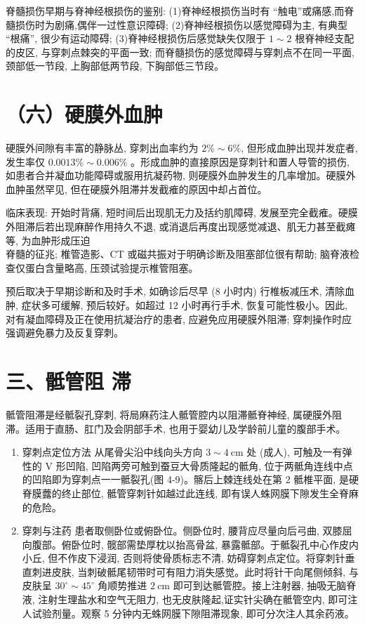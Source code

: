 \documentclass[10pt]{article}
\begin{document}
脊髓损伤早期与脊神经根损伤的鉴别: (1)脊神经根损伤当时有 “触电”或痛感,而脊髓损伤时为剧痛,偶伴一过性意识障碍; (2)脊神经根损伤以感觉障碍为主, 有典型 “根痛”, 很少有运动障碍; (3)脊神经根损伤后感觉缺失仅限于 $1 \sim 2$ 根脊神经支配的皮区, 与穿刺点棘突的平面一致; 而脊髓损伤的感觉障碍与穿刺点不在同一平面, 颈部低一节段, 上胸部低两节段, 下胸部低三节段。

\section*{（六）硬膜外血肿}
硬膜外间隙有丰富的静脉丛, 穿刺出血率约为 $2 \% \sim 6 \%$, 但形成血肿出现并发症者, 发生率仅 $0.0013 \% \sim 0.006 \%$ 。形成血肿的直接原因是穿刺针和置人导管的损伤, 如患者合并凝血功能障碍或服用抗凝药物, 则硬膜外血肿发生的几率增加。硬膜外血肿虽然罕见, 但在硬膜外阻滞并发截痽的原因中却占首位。

临床表现: 开始时背痛, 短时间后出现肌无力及括约肌障碍, 发展至完全截痽。硬膜外阻滞后若出现麻醉作用持久不退, 或消退后再度出现感觉减退、肌无力甚至截瘫等, 为血肿形成压迫\\
脊髓的征兆; 椎管造影、CT 或磁共振对于明确诊断及阻塞部位很有帮助; 脑脊液检查仅蛋白含量略高, 压颈试验提示椎管阻塞。

预后取决于早期诊断和及时手术, 如确诊后尽早 (8 小时内) 行椎板减压术, 清除血肿, 症状多可缓解, 预后较好。如超过 12 小时再行手术, 恢复可能性极小。因此, 对有凝血障碍及正在使用抗凝治疗的患者, 应避免应用硬膜外阻滞; 穿刺操作时应强调避免暴力及反复穿刺。

\section*{三、骶管阻 滞}
骶管阻滞是经骶裂孔穿刺, 将局麻药注人骶管腔内以阻滞骶脊神经, 属硬膜外阻滞。适用于直肠、肛门及会阴部手术, 也用于婴幼儿及学龄前儿童的腹部手术。

\begin{enumerate}
  \item 穿刺点定位方法 从尾骨尖沿中线向头方向 $3 \sim 4 \mathrm{~cm}$ 处 (成人), 可触及一有弹性的 $\mathrm{V}$ 形凹陷, 凹陷两旁可触到蚕豆大骨质隆起的骶角, 位于两骶角连线中点的凹陷即为穿刺点一一骶裂孔(图 4-9)。髂后上棘连线处在第 2 骶椎平面, 是硬脊膜虂的终止部位, 骶管穿刺针如越过此连线, 即有误人蛛网膜下隙发生全脊麻的危险。

  \item 穿刺与注药 患者取侧卧位或俯卧位。侧卧位时, 腰背应尽量向后弓曲, 双膝屈向腹部。俯卧位时, 髋部需垫厚枕以抬高骨盆, 暴露骶部。于骶裂孔中心作皮内小丘, 但不作皮下浸润, 否则将使骨质标志不清, 妨碍穿刺点定位。将穿刺针垂直刺进皮肤, 当刺破骶尾韧带时可有阻力消失感觉。此时将针干向尾侧倾斜, 与皮肤呈 $30^{\circ} \sim 45^{\circ}$ 角顺势推进 $2 \mathrm{~cm}$ 即可到达骶管腔。接上注射器, 抽吸无脑脊液, 注射生理盐水和空气无阻力, 也无皮肤隆起,证实针尖确在骶管空内, 即可注人试验剂量。观察 5 分钟内无蛛网膜下隙阻滞现象, 即可分次注人其余药液。

\end{enumerate}
\end{document}
